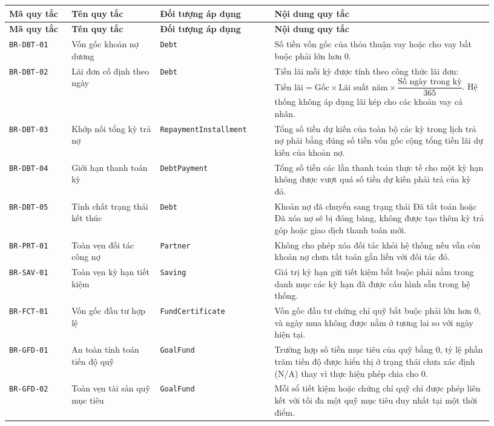 \documentclass[11pt,a4paper]{article}
\newcommand{\code}[1]{\texttt{#1}}
\newcommand{\lthead}[1]{%
  \hline#1\\\hline\endfirsthead
  \hline#1\\\hline\endhead
}
\newenvironment{smalltable}{\begingroup\footnotesize\renewcommand{\arraystretch}{1.25}\setlength{\tabcolsep}{3pt}}{\endgroup}
\begin{document}
\begin{smalltable}
\begin{longtable}{|L{0.12\linewidth}|L{0.17\linewidth}|L{0.22\linewidth}|L{0.42\linewidth}|}
\lthead{\textbf{Mã quy tắc} & \textbf{Tên quy tắc} & \textbf{Đối tượng áp dụng} & \textbf{Nội dung quy tắc}}
\code{BR-DBT-01} & Vốn gốc khoản nợ dương & \code{Debt} & Số tiền vốn gốc của thỏa thuận vay hoặc cho vay bắt buộc phải lớn hơn 0. \\ \hline
\code{BR-DBT-02} & Lãi đơn cố định theo ngày & \code{Debt} & Tiền lãi mỗi kỳ được tính theo công thức lãi đơn: $\text{Tiền lãi} = \text{Gốc} \times \text{Lãi suất năm} \times \dfrac{\text{Số ngày trong kỳ}}{365}$. Hệ thống không áp dụng lãi kép cho các khoản vay cá nhân. \\ \hline
\code{BR-DBT-03} & Khớp nối tổng kỳ trả nợ & \code{RepaymentInstallment} & Tổng số tiền dự kiến của toàn bộ các kỳ trong lịch trả nợ phải bằng đúng số tiền vốn gốc cộng tổng tiền lãi dự kiến của khoản nợ. \\ \hline
\code{BR-DBT-04} & Giới hạn thanh toán kỳ & \code{DebtPayment} & Tổng số tiền các lần thanh toán thực tế cho một kỳ hạn không được vượt quá số tiền dự kiến phải trả của kỳ đó. \\ \hline
\code{BR-DBT-05} & Tính chất trạng thái kết thúc & \code{Debt} & Khoản nợ đã chuyển sang trạng thái Đã tất toán hoặc Đã xóa nợ sẽ bị đóng băng, không được tạo thêm kỳ trả góp hoặc giao dịch thanh toán mới. \\ \hline
\code{BR-PRT-01} & Toàn vẹn đối tác công nợ & \code{Partner} & Không cho phép xóa đối tác khỏi hệ thống nếu vẫn còn khoản nợ chưa tất toán gắn liền với đối tác đó. \\ \hline
\code{BR-SAV-01} & Toàn vẹn kỳ hạn tiết kiệm & \code{Saving} & Giá trị kỳ hạn gửi tiết kiệm bắt buộc phải nằm trong danh mục các kỳ hạn đã được cấu hình sẵn trong hệ thống. \\ \hline
\code{BR-FCT-01} & Vốn gốc đầu tư hợp lệ & \code{FundCertificate} & Vốn gốc đầu tư chứng chỉ quỹ bắt buộc phải lớn hơn 0, và ngày mua không được nằm ở tương lai so với ngày hiện tại. \\ \hline
\code{BR-GFD-01} & An toàn tính toán tiến độ quỹ & \code{GoalFund} & Trường hợp số tiền mục tiêu của quỹ bằng 0, tỷ lệ phần trăm tiến độ được hiển thị ở trạng thái chưa xác định (N/A) thay vì thực hiện phép chia cho 0. \\ \hline
\code{BR-GFD-02} & Toàn vẹn tài sản quỹ mục tiêu & \code{GoalFund} & Mỗi sổ tiết kiệm hoặc chứng chỉ quỹ chỉ được phép liên kết với tối đa một quỹ mục tiêu duy nhất tại một thời điểm. \\ \hline
\end{longtable}
\end{smalltable}
\end{document}
